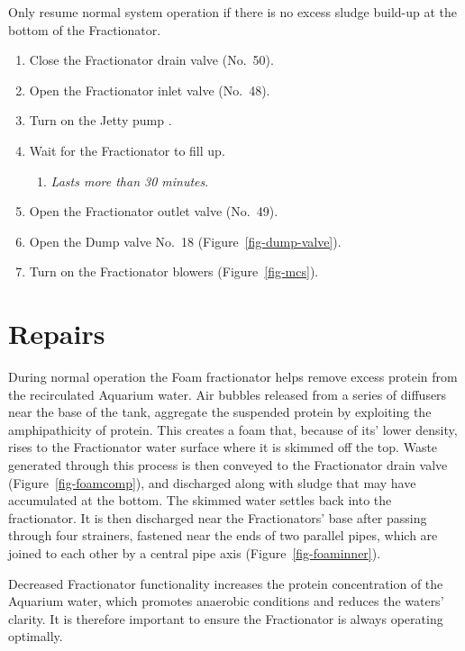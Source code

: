 \documentclass[
  letterpaper,
  DIV=11,
  numbers=noendperiod]{scrreprt}
\providecommand{\tightlist}{%
  \setlength{\itemsep}{0pt}\setlength{\parskip}{0pt}}\usepackage{longtable,booktabs,array}
\begin{document}
{Only resume normal system operation if there is no excess sludge
build-up at the bottom of the Fractionator}.

\begin{enumerate}
\def\labelenumi{\arabic{enumi}.}
\setcounter{enumi}{21}
\tightlist
\item
  Close the Fractionator drain valve (No.~50).
\item
  Open the Fractionator inlet valve (No.~48).
\item
  Turn on the Jetty pump .
\item
  Wait for the Fractionator to fill up.

  \begin{enumerate}
  \def\labelenumii{\roman{enumii})}
  \tightlist
  \item
    \emph{Lasts more than 30 minutes}.
  \end{enumerate}
\item
  Open the Fractionator outlet valve (No.~49).\\
\item
  Open the Dump valve No.~18 (Figure~\ref{fig-dump-valve}).
\item
  Turn on the Fractionator blowers (Figure~\ref{fig-mcs}).
\end{enumerate}

\hypertarget{repairs-1}{%
\section{Repairs}\label{repairs-1}}

During normal operation the Foam fractionator helps remove excess
protein from the recirculated Aquarium water. Air bubbles released from
a series of diffusers near the base of the tank, aggregate the suspended
protein by exploiting the amphipathicity of protein. This creates a foam
that, because of its' lower density, rises to the Fractionator water
surface where it is skimmed off the top. Waste generated through this
process is then conveyed to the Fractionator drain valve
(Figure~\ref{fig-foamcomp}), and discharged along with sludge that may
have accumulated at the bottom. The skimmed water settles back into the
fractionator. It is then discharged near the Fractionators' base after
passing through four strainers, fastened near the ends of two parallel
pipes, which are joined to each other by a central pipe axis
(Figure~\ref{fig-foaminner}).

Decreased Fractionator functionality increases the protein concentration
of the Aquarium water, which promotes anaerobic conditions and reduces
the waters' clarity. It is therefore important to ensure the
Fractionator is always operating optimally.
\end{document}
